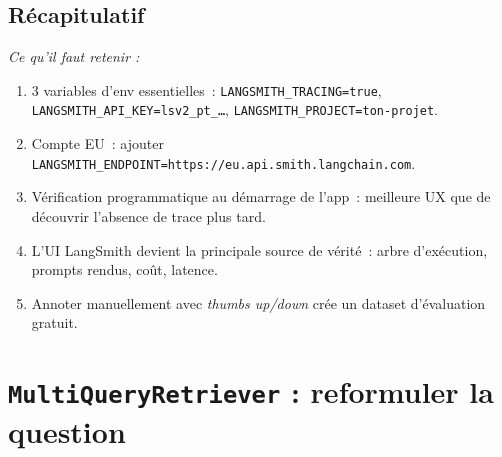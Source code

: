 \documentclass[11pt,a4paper]{article}
\begin{document}
\subsection*{Récapitulatif}
{\itshape\sloppy
\textit{Ce qu'il faut retenir :}
\begin{enumerate}[leftmargin=*]
  \item 3 variables d'env essentielles~: \texttt{LANGSMITH\_TRACING=true},
        \texttt{LANGSMITH\_API\_KEY=lsv2\_pt\_\dots},
        \texttt{LANGSMITH\_PROJECT=ton-projet}.
  \item Compte EU~: ajouter
        \texttt{LANGSMITH\_ENDPOINT=https://eu.api.smith.langchain.com}.
  \item Vérification programmatique au démarrage de l'app~: meilleure
        UX que de découvrir l'absence de trace plus tard.
  \item L'UI LangSmith devient la principale source de vérité~: arbre
        d'exécution, prompts rendus, coût, latence.
  \item Annoter manuellement avec \emph{thumbs up/down} crée un dataset
        d'évaluation gratuit.
\end{enumerate}
\par}

\section{\texttt{MultiQueryRetriever} : reformuler la question}
\end{document}
